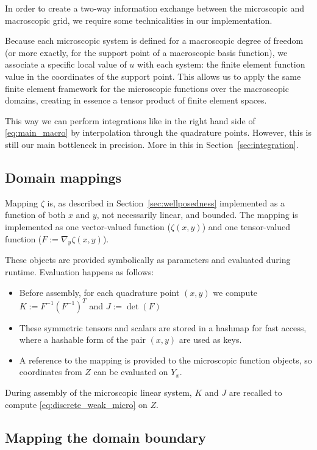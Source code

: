 \documentclass{article}
\begin{document}
In order to create a two-way information exchange between the microscopic and macroscopic grid, we require some technicalities in our implementation.

Because each microscopic system is defined for a macroscopic degree of freedom (or more exactly, for the support point of a macroscopic basis function), we associate a specific local value of $u$ with each system: the finite element function value in the coordinates of the support point.
This allows us to apply the same finite element framework for the microscopic functions over the macroscopic domains, creating in essence a tensor product of finite element spaces.

This way we can perform integrations like in the right hand side of \eqref{eq:main_macro} by interpolation through the quadrature points. However, this is still our main bottleneck in precision. More in this in Section~\ref{sec:integration}.

\subsection{Domain mappings}
\label{sec:mapping}
Mapping $\zeta$ is, as described in Section~\ref{sec:wellposedness} implemented as a function of both $x$ and $y$, not necessarily linear, and bounded. The mapping is implemented as one vector-valued function ($\zeta(x,y)$) and one tensor-valued function ($F:=\nabla_y \zeta(x,y)$).

These objects are provided symbolically as parameters and evaluated during runtime.
Evaluation happens as follows:
\begin{itemize}
    \item Before assembly, for each quadrature point $(x,y)$ we compute $K := F^{-1} \left(F^{-1}\right)^{T}$ and $J := \det \left(F \right)$
    \item These symmetric tensors and scalars are stored in a hashmap for fast access, where a hashable form of the pair $(x,y)$ are used as keys.
    \item A reference to the mapping is provided to the microscopic function objects, so coordinates from $Z$ can be evaluated on $Y_x$.
\end{itemize}

During assembly of the microscopic linear system, $K$ and $J$ are recalled to compute \eqref{eq:discrete_weak_micro} on $Z$.

\subsection{Mapping the domain boundary}
\label{sec:boundary_mapping}
\end{document}

